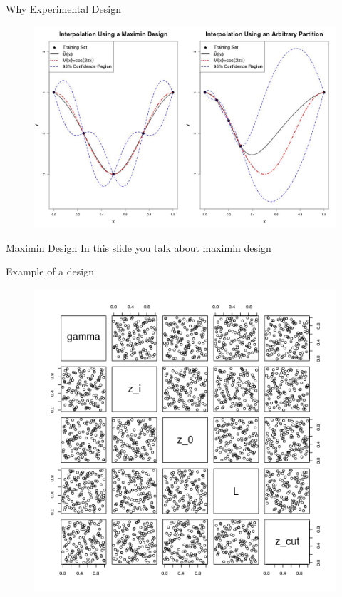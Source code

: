 \documentclass[11pt]{beamer}
\theoremstyle{plain}
\theoremstyle{definition}
\begin{document}
\begin{frame}{Why Experimental Design}
\begin{figure}
\includegraphics[scale=0.2]{../FigChap2/partitionComparison.jpg}
\end{figure}

\end{frame}

\begin{frame}{Maximin Design}
In this slide you talk about maximin design
\end{frame}

\begin{frame}{Example of a design}
\begin{figure}
\includegraphics[scale=0.35]{./codes/experimental_design128.png}
\end{figure}

\end{frame}
\end{document}
